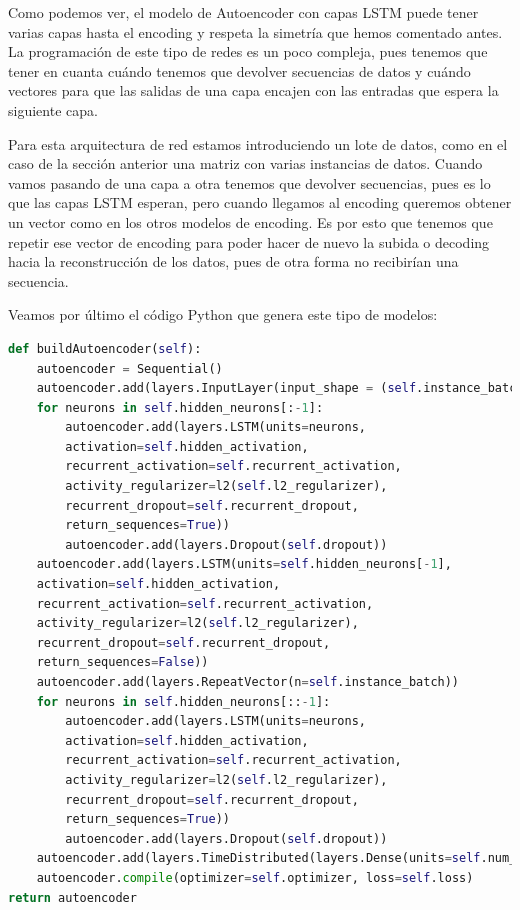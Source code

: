 Como podemos ver, el modelo de Autoencoder con capas LSTM puede tener varias capas hasta el encoding y respeta la simetría que hemos comentado antes. La programación de este tipo de redes es un poco compleja, pues tenemos que tener en cuanta cuándo tenemos que devolver secuencias de datos y cuándo vectores para que las salidas de una capa encajen con las entradas que espera la siguiente capa.

Para esta arquitectura de red estamos introduciendo un lote de datos, como en el caso de la sección anterior una matriz con varias instancias de datos. Cuando vamos pasando de una capa a otra tenemos que devolver secuencias, pues es lo que las capas LSTM esperan, pero cuando llegamos al encoding queremos obtener un vector como en los otros modelos de encoding. Es por esto que tenemos que repetir ese vector de encoding para poder hacer de nuevo la subida o decoding hacia la reconstrucción de los datos, pues de otra forma no recibirían una secuencia.

Veamos por último el código Python que genera este tipo de modelos:

\begin{lstlisting}[language=Python]
def buildAutoencoder(self):
	autoencoder = Sequential()
	autoencoder.add(layers.InputLayer(input_shape = (self.instance_batch, self.num_features)))
	for neurons in self.hidden_neurons[:-1]:
		autoencoder.add(layers.LSTM(units=neurons,
		activation=self.hidden_activation,
		recurrent_activation=self.recurrent_activation,
		activity_regularizer=l2(self.l2_regularizer),
		recurrent_dropout=self.recurrent_dropout,
		return_sequences=True))
		autoencoder.add(layers.Dropout(self.dropout))
	autoencoder.add(layers.LSTM(units=self.hidden_neurons[-1],
	activation=self.hidden_activation,
	recurrent_activation=self.recurrent_activation,
	activity_regularizer=l2(self.l2_regularizer),
	recurrent_dropout=self.recurrent_dropout,
	return_sequences=False))
	autoencoder.add(layers.RepeatVector(n=self.instance_batch))
	for neurons in self.hidden_neurons[::-1]:
		autoencoder.add(layers.LSTM(units=neurons,
		activation=self.hidden_activation,
		recurrent_activation=self.recurrent_activation,
		activity_regularizer=l2(self.l2_regularizer),
		recurrent_dropout=self.recurrent_dropout,
		return_sequences=True))
		autoencoder.add(layers.Dropout(self.dropout))
	autoencoder.add(layers.TimeDistributed(layers.Dense(units=self.num_features)))
	autoencoder.compile(optimizer=self.optimizer, loss=self.loss)
return autoencoder
\end{lstlisting}

